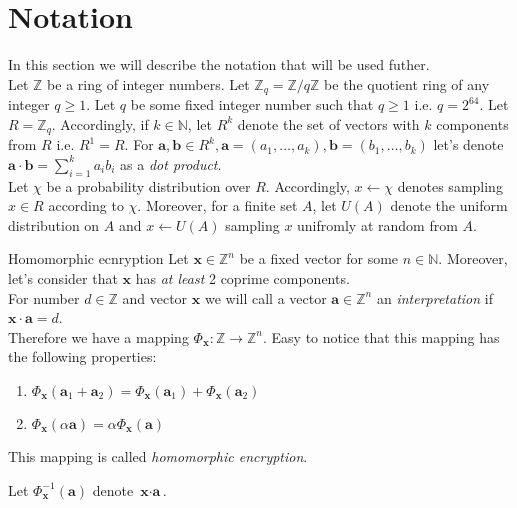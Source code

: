 \section{Notation}
	In this section we will describe the notation that will be used futher. \\
	Let $ \mathbb{Z} $ be a ring of integer numbers. Let $ \mathbb{Z}_q = \mathbb{Z} / q\mathbb{Z} $ be the quotient ring of any integer $ q \geq 1 $. Let $ q $ be some fixed integer number such that $ q \geq 1 $ i.e. $ q = 2^{64} $. Let $ R = \mathbb{Z}_q $. Accordingly, if $ k \in \mathbb{N} $, let $ R^k $ denote the set of vectors with $ k $ components from $ R $ i.e.  $ R^1 = R $. For $ \textbf{a}, \textbf{b} \in R^k, \textbf{a} = (a_1, \dots, a_k), \textbf{b} = ( b_1, \dots, b_k ) $ let's denote $ \textbf{a} \cdot \textbf{b} = \sum_{i = 1}^{k} a_i b_i $ as a \textit{dot product}. \\
	Let $ \chi $ be a probability distribution over $ R $. Accordingly, $ x \leftarrow \chi $ denotes sampling $ x \in R $ according to $ \chi $. Moreover, for a finite set $ A $, let $ U(A) $ denote the uniform distribution on $ A $ and $ x \leftarrow U(A) $ sampling $ x $ unifromly at random from $ A $.
	\begin{definition}{Homomorphic ecnryption}
		Let $ \textbf{x} \in \mathbb{Z}^n $ be a fixed vector for some $ n \in \mathbb{N} $. Moreover, let's consider that $ \textbf{x} $ has \textit{at least} 2 coprime components. \\
		For number $ d \in \mathbb{Z} $ and vector $ \textbf{x} $ we will call a vector $ \textbf{a} \in \mathbb{Z}^n $ an \textit{interpretation} if $ \textbf{x} \cdot \textbf{a} = d $. \\
		Therefore we have a mapping $ \Phi_{\textbf{x}}: \mathbb{Z} \rightarrow \mathbb{Z}^n $. Easy to notice that this mapping has the following properties:
		\begin{enumerate}
			\item $ \Phi_{\textbf{x}}(\textbf{a}_1 + \textbf{a}_2) = \Phi_{\textbf{x}}(\textbf{a}_1) + \Phi_{\textbf{x}}(\textbf{a}_2) $
			\item $ \Phi_{\textbf{x}}(\alpha \textbf{a}) = \alpha \Phi_{\textbf{x}}(\textbf{a}) $
		\end{enumerate}
		This mapping is called \textit{homomorphic encryption}.
	\end{definition}
	
	\begin{remark}
		Let $ \Phi^{-1}_{\textbf{x}}(\textbf{a}) $ denote $ \textbf{x} \cdot \textbf{a} $.
	\end{remark}
		
